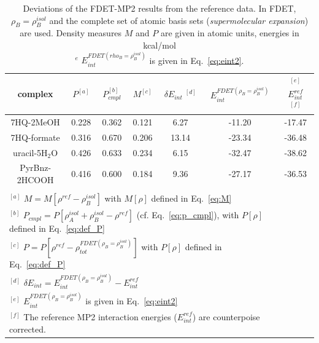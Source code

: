 \documentclass[amsmath,amssymb,preprint,aip,jcp]{revtex4-1}
\begin{document}
\begin{table}
{
\begin{center}
\begin{tabular}{|c|c|c|c|c|c|c|}
\hline
 complex & $P^{[a]}$ & $P_{cmpl}^{[b]}$ & $M^{[c]}$ & $\delta E_{int}\;^{[d]}$ & $E^{FDET(\rho_B=\rho_B^{isol})}_{int}$ & $^{[e]}$ $E_{int}^{ref}$ $^{[f]}$ \\ \hline
7HQ-2MeOH & 0.228 & 0.362 & 0.121 & 6.27 & -11.20 & -17.47 \\ \hline
7HQ-formate & 0.316 & 0.670 & 0.206 & 13.14 & -23.34 & -36.48 \\ \hline
uracil-5H$_2$O & 0.426 & 0.633 & 0.234 & 6.15 & -32.47 & -38.62 \\ \hline
PyrBnz-2HCOOH & 0.416 & 0.600 & 0.184 & 9.36 & -27.17 & -36.53 \\ \hline
\multicolumn{6}{c}{ } \\
\multicolumn{6}{l}{$^{[a]}$ $M=M[\rho^{ref} - \rho^{isol}_{B}]$ with $M[\rho]$ defined in Eq.~\ref{eq:M}}\\
\multicolumn{6}{l}{$^{[b]}$ $P_{cmpl}=P[\rho_A^{isol}+\rho_B^{isol} - \rho^{ref}]$ (cf. Eq.~\ref{eq:p_cmpl}), with $P[\rho]$ defined in Eq.~\ref{eq:def_P}}\\
\multicolumn{6}{l}{$^{[c]}$ $P=P[\rho^{ref} - \rho_{tot}^{FDET(\rho_B=\rho_B^{isol})}]$ with $P[\rho]$ defined in Eq.~\ref{eq:def_P}}\\
\multicolumn{6}{l}{$^{[d]}$ $\delta E_{int}=E^{FDET(\rho_B=\rho_B^{isol})}_{int}-E_{int}^{ref}$} \\
\multicolumn{6}{l}{$^{[e]}$ $E^{FDET(\rho_B=\rho_B^{isol})}_{int}$ is given in Eq.~\ref{eq:eint2}}\\
\multicolumn{6}{l}{$^{[f]}$ The reference MP2 interaction energies ($E_{int}^{ref}$) are counterpoise corrected.}
\end{tabular}
\end{center}
}%
\caption{Deviations of the FDET-MP2 results from the reference data. In FDET, $\rho_B=\rho_B^{isol}$ and the complete set of atomic basis sets ({\it supermolecular expansion}) are used. 
Density measures $M$ and $P$ are given in atomic units, energies in kcal/mol\\
$^e$ $E^{FDET(rho_B=\rho_B^{isol})}_{int}$ is given in Eq.~\ref{eq:eint2}.
}
\label{table:SE_isol}
\end{table}
\end{document}
